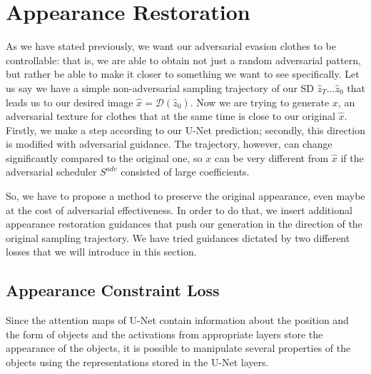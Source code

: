 

\section{Appearance Restoration}

As we have stated previously, we want our adversarial evasion clothes to be controllable: that is, we are able to obtain not just a random adversarial pattern, but rather be able to make it closer to something we want to see specifically.
Let us say we have a simple non-adversarial sampling trajectory of our SD $\hat{z}_T\ldots\hat{z}_0$ that leads us to our desired image $\hat{x} = \mathcal{D}(\hat{z}_0)$.
Now we are trying to generate $x$, an adversarial texture for clothes that at the same time is close to our original $\hat{x}$.
Firstly, we make a step according to our U-Net prediction; secondly, this direction is modified with adversarial guidance. 
The trajectory, however, can change significantly compared to the original one, so $x$ can be very different from $\hat{x}$ if the adversarial scheduler $S^{adv}$ consisted of large coefficients.

So, we have to propose a method to preserve the original appearance, even maybe at the cost of adversarial effectiveness. 
In order to do that, we insert additional appearance restoration guidances that push our generation in the direction of the original sampling trajectory.
We have tried guidances dictated by two different losses that we will introduce in this section.

\subsection{Appearance Constraint Loss}

Since the attention maps of U-Net contain information about the position and the form of objects and the activations from appropriate layers store the appearance of the objects, it is possible to manipulate several properties of the objects using the representations stored in the U-Net layers.

